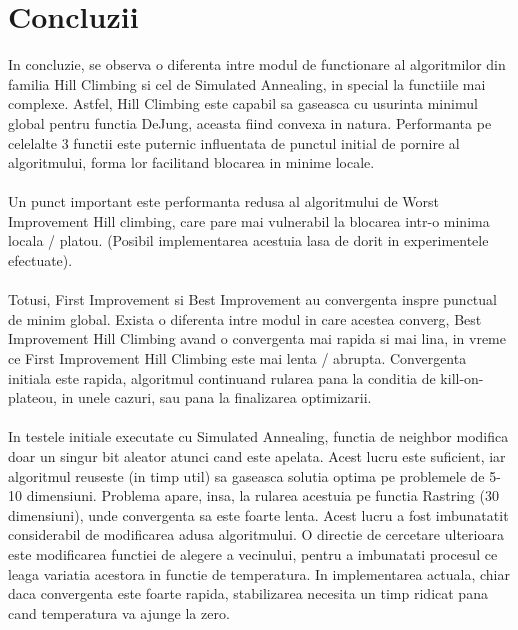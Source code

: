 \documentclass{article}
\begin{document}
\section{Concluzii}
In concluzie, se observa o diferenta intre modul de functionare al algoritmilor din familia Hill Climbing si cel de Simulated Annealing, in special la functiile mai complexe. Astfel, Hill Climbing este capabil sa gaseasca cu usurinta minimul global pentru functia DeJung, aceasta fiind convexa in natura. Performanta pe celelalte 3 functii este puternic influentata de punctul initial de pornire al algoritmului, forma lor facilitand blocarea in minime locale. 
\\ \\
Un punct important este performanta redusa al algoritmului de Worst Improvement Hill climbing, care pare mai vulnerabil la blocarea intr-o minima locala / platou. (Posibil implementarea acestuia lasa de dorit in experimentele efectuate). \\ \\
Totusi, First Improvement si Best Improvement au convergenta inspre punctual de minim global. Exista o diferenta intre modul in care acestea converg, Best Improvement Hill Climbing avand o convergenta mai rapida si mai lina, in vreme ce First Improvement Hill Climbing este mai lenta / abrupta. Convergenta initiala este rapida, algoritmul continuand rularea pana la conditia de kill-on-plateou, in unele cazuri, sau pana la finalizarea optimizarii.
\\ \\
In testele initiale executate cu Simulated Annealing, functia de neighbor modifica doar un singur bit aleator atunci cand este apelata. Acest lucru este suficient, iar algoritmul reuseste (in timp util) sa gaseasca solutia optima pe problemele de 5-10 dimensiuni. Problema apare, insa, la rularea acestuia pe functia Rastring (30 dimensiuni),  unde convergenta sa este foarte lenta. Acest lucru a fost imbunatatit considerabil de modificarea adusa algoritmului.
O directie de cercetare ulterioara este modificarea functiei de alegere a vecinului, pentru a imbunatati procesul ce leaga variatia acestora in functie de temperatura. In implementarea actuala, chiar daca convergenta este foarte rapida, stabilizarea necesita un timp ridicat pana cand temperatura va ajunge la zero.
\end{document}
